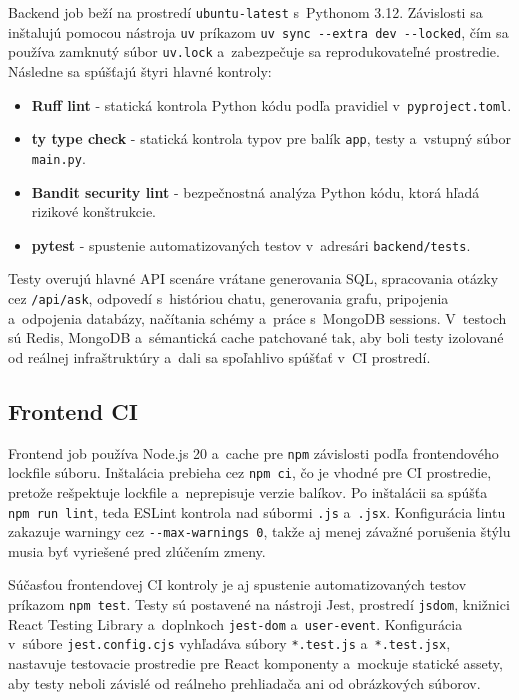 \documentclass[a4paper, 12pt]{article}
\begin{document}
Backend job beží na prostredí \texttt{ubuntu-latest} s~Pythonom 3.12. Závislosti sa inštalujú pomocou nástroja \texttt{uv} príkazom \texttt{uv sync {-}{-}extra dev {-}{-}locked}, čím sa používa zamknutý súbor \texttt{uv.lock} a~zabezpečuje sa reprodukovateľné prostredie. Následne sa spúšťajú štyri hlavné kontroly:

\begin{itemize}
    \item \textbf{Ruff lint} - statická kontrola Python kódu podľa pravidiel v~\texttt{pyproject.toml}.
    \item \textbf{ty type check} - statická kontrola typov pre balík \texttt{app}, testy a~vstupný súbor \texttt{main.py}.
    \item \textbf{Bandit security lint} - bezpečnostná analýza Python kódu, ktorá hľadá rizikové konštrukcie.
    \item \textbf{pytest} - spustenie automatizovaných testov v~adresári \texttt{backend/tests}.
\end{itemize}

Testy overujú hlavné API scenáre vrátane generovania SQL, spracovania otázky cez \texttt{/api/ask}, odpovedí s~históriou chatu, generovania grafu, pripojenia a~odpojenia databázy, načítania schémy a~práce s~MongoDB sessions. V~testoch sú Redis, MongoDB a~sémantická cache patchované tak, aby boli testy izolované od reálnej infraštruktúry a~dali sa spoľahlivo spúšťať v~CI prostredí.

\subsection{Frontend CI}

Frontend job používa Node.js 20 a~cache pre \texttt{npm} závislosti podľa frontendového lockfile súboru. Inštalácia prebieha cez \texttt{npm ci}, čo je vhodné pre CI prostredie, pretože rešpektuje lockfile a~neprepisuje verzie balíkov. Po inštalácii sa spúšťa \texttt{npm run lint}, teda ESLint kontrola nad súbormi \texttt{.js} a~\texttt{.jsx}. Konfigurácia lintu zakazuje warningy cez \texttt{{-}{-}max-warnings 0}, takže aj menej závažné porušenia štýlu musia byť vyriešené pred zlúčením zmeny.

Súčasťou frontendovej CI kontroly je aj spustenie automatizovaných testov príkazom \texttt{npm test}. Testy sú postavené na nástroji Jest, prostredí \texttt{jsdom}, knižnici React Testing Library a~doplnkoch \texttt{jest-dom} a~\texttt{user-event}. Konfigurácia v~súbore \texttt{jest.config.cjs} vyhľadáva súbory \texttt{*.test.js} a~\texttt{*.test.jsx}, nastavuje testovacie prostredie pre React komponenty a~mockuje statické assety, aby testy neboli závislé od reálneho prehliadača ani od obrázkových súborov.
\end{document}
